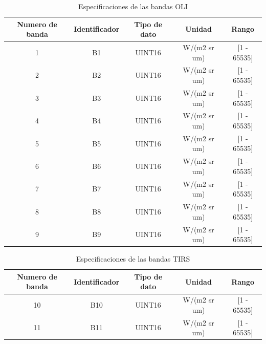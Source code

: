 	\begin{table}[h!]
		\centering
		\begin{tabular}{|c|c|c|c|c|}
			\hline
			\textbf{Numero de banda} & \textbf{Identificador} &\textbf{Tipo de dato} & \textbf{Unidad} & \textbf{Rango}\\
			\hline
			1  & B1 & UINT16 &W/(m2 sr um)& [1 - 65535]\\
			2 & B2 & UINT16&W/(m2 sr um)& [1 - 65535]\\
			3 & B3 & UINT16&W/(m2 sr um)& [1 - 65535] \\
			4 & B4 & UINT16&W/(m2 sr um)& [1 - 65535] \\
			5 & B5 & UINT16&W/(m2 sr um)& [1 - 65535] \\
			6 & B6 & UINT16&W/(m2 sr um)& [1 - 65535] \\
			7 & B7 & UINT16 &W/(m2 sr um)& [1 - 65535] \\
			8 & B8  & UINT16&W/(m2 sr um)& [1 - 65535]\\
			9 & B9  & UINT16 &W/(m2 sr um)& [1 - 65535]\\
			\hline
		\end{tabular}
		\caption{Especificaciones de las bandas OLI}
		\label{tabla2.2}
	\end{table}
	
	\begin{table}[h!]
		\centering
		\begin{tabular}{|c|c|c|c|c|}
			\hline
			\textbf{Numero de banda} & \textbf{Identificador} &\textbf{Tipo de dato} & \textbf{Unidad} & \textbf{Rango}\\
			\hline
			10  & B10 & UINT16 &W/(m2 sr um)& [1 - 65535]\\
			11 & B11 & UINT16&W/(m2 sr um)& [1 - 65535]\\
			
			\hline
		\end{tabular}
		\caption{Especificaciones de las bandas TIRS}
		\label{tabla2.3}
	\end{table}
	
	
	
	
